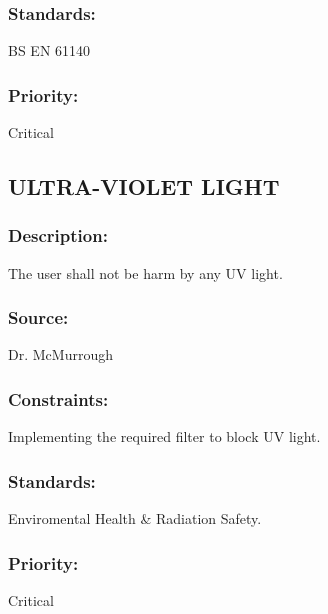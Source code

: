 \subsubsection{Standards:} 
	{BS EN 61140}
\subsubsection{Priority:} 
	{Critical}
\newline
	
\subsection{\text  ULTRA-VIOLET LIGHT}
\subsubsection{Description:} 
	{The user shall not be harm by any UV light.}
\subsubsection{Source:} 
	{Dr. McMurrough}
\subsubsection{Constraints:} 
	{Implementing the required filter to block UV light.}
\subsubsection{Standards:} 
	{Enviromental Health \& Radiation Safety.}
\subsubsection{Priority:} 
	{Critical}
	